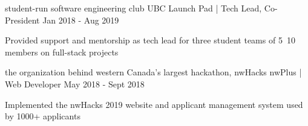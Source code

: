 \begin{cventries}

  \cventry
    {student-run software engineering club} %
    {UBC Launch Pad | Tech Lead, Co-President} %
    {} %
    {
        Jan 2018 - Aug 2019
    } %
    {
      \begin{cvitems} %
        \item {Provided support and mentorship as tech lead for three student teams of 5~10 members on full-stack projects}
      \end{cvitems}
    }

  \cventry
    {the organization behind western Canada's largest hackathon, nwHacks} %
    {nwPlus | Web Developer} %
    {} %
    {May 2018 - Sept 2018} %
    {
      \begin{cvitems} %
        \item {Implemented the nwHacks 2019 website and applicant management system used by 1000+ applicants}
      \end{cvitems}
    }

\end{cventries}
